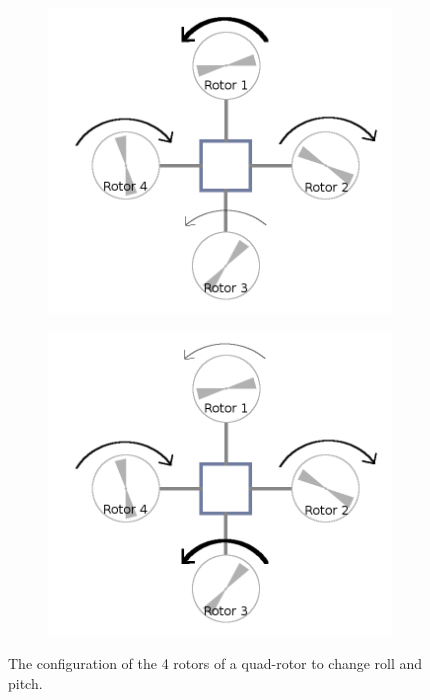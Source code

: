 \documentclass[BTech]{iitmdiss}
\begin{document}
\begin{figure}[h]
  \centering
    \begin{subfigure}[c]{0.45\textwidth}
      \centering
        \includegraphics[width=\textwidth]{quadrotor_rotors_roll.png}
        \caption{\label{fig:fig1}}
    \end{subfigure}
    \begin{subfigure}[c]{0.45\textwidth}
      \centering
        \includegraphics[width=\textwidth]{quadrotor_rotors_pitch.png}
        \caption{\label{fig:fig2}}
    \end{subfigure}
    \caption{The configuration of the 4 rotors of a quad-rotor to change roll and pitch.}
\end{figure}
\end{document}
